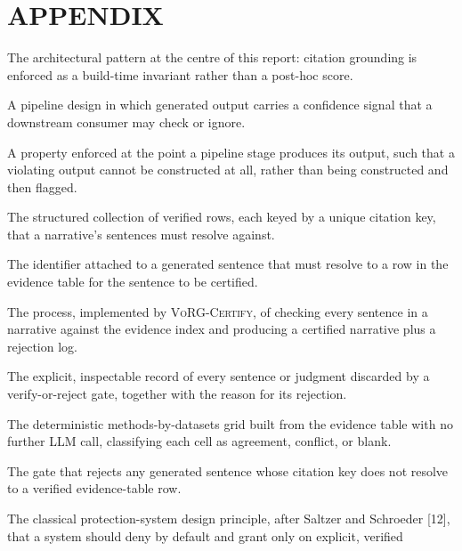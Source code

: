 \documentclass[12pt,a4paper]{report}
\begin{document}
\chapter*{APPENDIX}
\thispagestyle{plain}
\begin{description}[leftmargin=3.6cm,style=nextline]
  \item[Verify-or-Reject Grounding (VoRG)] The architectural pattern at the
        centre of this report: citation grounding is enforced as a build-time
        invariant rather than a post-hoc score.
  \item[Scored grounding] A pipeline design in which generated output carries
        a confidence signal that a downstream consumer may check or ignore.
  \item[Build-time invariant] A property enforced at the point a pipeline
        stage produces its output, such that a violating output cannot be
        constructed at all, rather than being constructed and then flagged.
  \item[Evidence table] The structured collection of verified rows, each keyed
        by a unique citation key, that a narrative's sentences must resolve
        against.
  \item[Citation key] The identifier attached to a generated sentence that
        must resolve to a row in the evidence table for the sentence to be
        certified.
  \item[Certification] The process, implemented by \textsc{VoRG-Certify}, of
        checking every sentence in a narrative against the evidence index and
        producing a certified narrative plus a rejection log.
  \item[Rejection log] The explicit, inspectable record of every sentence or
        judgment discarded by a verify-or-reject gate, together with the
        reason for its rejection.
  \item[Synthesis matrix] The deterministic methods-by-datasets grid built
        from the evidence table with no further LLM call, classifying each
        cell as agreement, conflict, or blank.
  \item[Narrative verifier] The gate that rejects any generated sentence whose
        citation key does not resolve to a verified evidence-table row.
  \item[Fail-safe defaults] The classical protection-system design principle,
        after Saltzer and Schroeder [12], that a system
        should deny by default and grant only on explicit, verified

\end{description}
\end{document}
